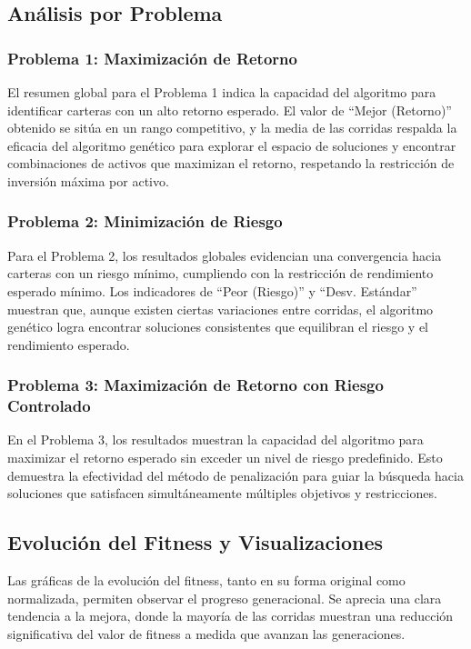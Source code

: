 \subsection{Análisis por Problema}

\subsubsection{Problema 1: Maximización de Retorno}

El resumen global para el Problema 1 indica la capacidad del algoritmo para identificar carteras con un alto retorno esperado. El valor de ``Mejor (Retorno)'' obtenido se sitúa en un rango competitivo, y la media de las corridas respalda la eficacia del algoritmo genético para explorar el espacio de soluciones y encontrar combinaciones de activos que maximizan el retorno, respetando la restricción de inversión máxima por activo.

\subsubsection{Problema 2: Minimización de Riesgo}

Para el Problema 2, los resultados globales evidencian una convergencia hacia carteras con un riesgo mínimo, cumpliendo con la restricción de rendimiento esperado mínimo. Los indicadores de ``Peor (Riesgo)'' y ``Desv. Estándar'' muestran que, aunque existen ciertas variaciones entre corridas, el algoritmo genético logra encontrar soluciones consistentes que equilibran el riesgo y el rendimiento esperado.

\subsubsection{Problema 3: Maximización de Retorno con Riesgo Controlado}

En el Problema 3, los resultados muestran la capacidad del algoritmo para maximizar el retorno esperado sin exceder un nivel de riesgo predefinido. Esto demuestra la efectividad del método de penalización para guiar la búsqueda hacia soluciones que satisfacen simultáneamente múltiples objetivos y restricciones.

\subsection{Evolución del Fitness y Visualizaciones}
Las gr\'aficas de la evoluci\'on del fitness, tanto en su forma original como normalizada, permiten observar el progreso generacional. Se aprecia una clara tendencia a la mejora, donde la mayor\'ia de las corridas muestran una reducci\'on significativa del valor de fitness a medida que avanzan las generaciones.

